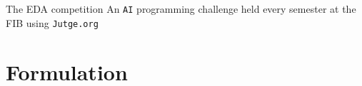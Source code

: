 \documentclass{beamer}
\begin{document}
\begin{frame}{The EDA competition}
An \texttt{AI} programming challenge held every semester at the FIB using \texttt{Jutge.org}
\begin{figure}[H]
\begin{minipage}{0.3\textwidth}
\noindent{}
\end{minipage}
\begin{minipage}{0.65\textwidth}
\noindent{}
\end{minipage}
\end{figure}
\end{frame}
\section{Formulation}
\end{document}
